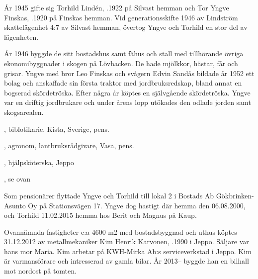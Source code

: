 År 1945 gifte sig Torhild Lindén, .1922 på Silvast hemman och Tor Yngve Finskas, .1920 på Finskas hemman. Vid generationsskifte 1946 av Lindström skattelägenhet 4:7 av Silvast hemman, övertog Yngve och Torhild en stor del av lägenheten.

År 1946 byggde de sitt bostadshus samt fähus och stall med tillhörande övriga ekonomibyggnader i skogen på Lövbacken. De hade mjölkkor, hästar, får och grisar. Yngve med bror Leo Finskas och svågern Edvin Sandås bildade år 1952 ett bolag och anskaffade sin första traktor med jordbruksredskap, bland annat en bogserad skördetröska. Efter några år köptes en självgående skördetröska. Yngve var en driftig jordbrukare och under årens lopp utökades den odlade jorden samt skogsarealen.
\begin{jhchildren}
  \item {}, biblotikarie, Kista, Sverige, pens.
  \item {}, agronom, lantbruksrådgivare, Vasa, pens.
  \item {}, hjälpsköterska, Jeppo
  \item {}, se ovan
\end{jhchildren}
Som pensionärer flyttade Yngve och Torhild till lokal 2 i Bostads Ab Gökbrinken-Asunto Oy på Stationsvägen 17. Yngve dog hastigt där hemma den 06.08.2000, och Torhild 11.02.2015 hemma hos Berit och Magnus på Kaup.






Ovannämnda fastigheter c:a 4600 m2 med bostadsbyggnad och uthus köptes 31.12.2012 av metallmekaniker Kim Henrik Karvonen, .1990 i Jeppo. Säljare var hans mor Maria. Kim arbetar på KWH-Mirka Ab:s serviceverkstad i Jeppo. Kim är varmansförare och intresserad av gamla bilar. År 2013-- byggde han en bilhall mot nordost på tomten.


